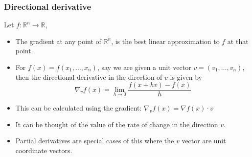 \documentclass{beamer}
\begin{document}
\begin{frame}
\frametitle{Directional derivative}
Let $f: \mathbb{R}^n \rightarrow \mathbb{R}$,
\begin{itemize}
    \item The gradient at any point of $\mathbb{R}^n$, is the best linear approximation to $f$ at that point. 
    \item For $f(x) = f(x_1,\dots, x_n)$, say we are given a unit vector $v=(v_1,\dots, v_n)$, then the directional derivative in the direction of $v$ is given by \[ \nabla_v f(x) = \lim_{h\rightarrow 0}\frac{f(x+hv)-f(x)}{h} \]
    \item This can be calculated using the gradient: $\nabla_v f(x) = \nabla f(x) \cdot v$
    \item It can be thought of the value of the rate of change in the direction $v$.
    \item Partial derivatives are special cases of this where the $v$ vector are unit coordinate vectors.
\end{itemize}


\end{frame}

\end{document}
